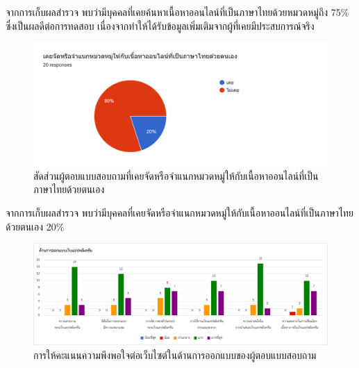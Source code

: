 \documentclass[12pt,oneside,openright,a4paper]{cpe-thai-project}
\begin{document}
\begin{itemize}
\begin{enumerate}
      \hspace{1cm}จากการเก็บผลสำรวจ พบว่ามีบุคคลที่เคยค้นหาเนื้อหาออนไลน์ที่เป็นภาษาไทยด้วยหมวดหมู่ถึง 75\% 
      ซึ่งเป็นผลดีต่อการทดสอบ เนื่องจากทำให้ได้รับข้อมูลเพิ่มเติมจากผู้ที่เคยมีประสบการณ์จริง
      \newpage
      \begin{figure}[!ht]\centering
        \includegraphics[width=\textwidth]{./img/test/tag.png}
        \caption{สัดส่วนผู้ตอบแบบสอบถามที่เคยจัดหรือจำแนกหมวดหมู่ให้กับเนื้อหาออนไลน์ที่เป็นภาษาไทยด้วยตนเอง}\label{fig:user_test_tag}
      \end{figure}
      
      \hspace{1cm}จากการเก็บผลสำรวจ พบว่ามีบุคคลที่เคยจัดหรือจำแนกหมวดหมู่ให้กับเนื้อหาออนไลน์ที่เป็นภาษาไทยด้วยตนเอง 20\% 
      
      \begin{figure}[!ht]\centering
        \includegraphics[width=\textwidth]{./img/test/design.png}
        \caption{การให้คะแนนความพึงพอใจต่อเว็บไซต์ในด้านการออกแบบของผู้ตอบแบบสอบถาม}\label{fig:user_test_design}
      \end{figure}


\end{enumerate}
\end{itemize}
\end{document}
